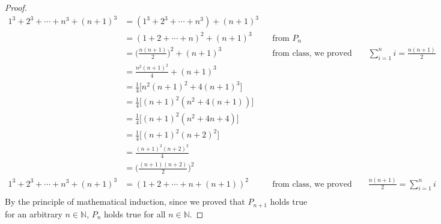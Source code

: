 \documentclass[13pt]{article}
\begin{document}
\begin{proof}
  \begin{align*}
    1^3 + 2^3 + \cdots + n^3 + (n + 1)^3 &= (1^3 + 2^3 + \cdots + n^3) + (n + 1)^3 \\
                                         &= (1 + 2 + \cdots + n)^2 + (n + 1)^3 && \text{from } P_n \\
                                         &= \bigg(\frac{n(n + 1)}{2}\bigg)^2 + (n + 1)^3
                                         && \text{from class, we proved that } \sum_{i = 1}^ni =
                                            \frac{n(n + 1)}{2} \\
                                         &= \frac{n^2(n + 1)^2}{4} + (n + 1)^3 \\
                                         &= \frac{1}{4}\bigg[n^2(n + 1)^2 + 4(n + 1)^3\bigg] \\
                                         &= \frac{1}{4}\bigg[(n + 1)^2(n^2 + 4(n + 1))\bigg] \\
                                         &= \frac{1}{4}\bigg[(n + 1)^2(n^2 + 4n + 4)\bigg] \\
                                         &= \frac{1}{4}\bigg[(n + 1)^2(n + 2)^2\bigg] \\
                                         &= \frac{(n + 1)^2(n + 2)^2}{4} \\
                                         &= \bigg(\frac{(n + 1)(n + 2)}{2}\bigg)^2 \\
    1^3 + 2^3 + \cdots + n^3 + (n + 1)^3 &= (1 + 2 + \cdots + n + (n + 1))^2 && \text{from class, we
                                                                                proved that }
                                                                                \frac{n(n + 1)}{2} =
                                                                                \sum_{i = 1}^ni \\
  \end{align*}
  By the principle of mathematical induction, since we proved that $P_{n + 1}$ holds true for an
  arbitrary $n \in \mathbb{N}$, $P_n$ holds true for all $n \in \mathbb{N}$.
\end{proof}





\newpage
\end{document}
